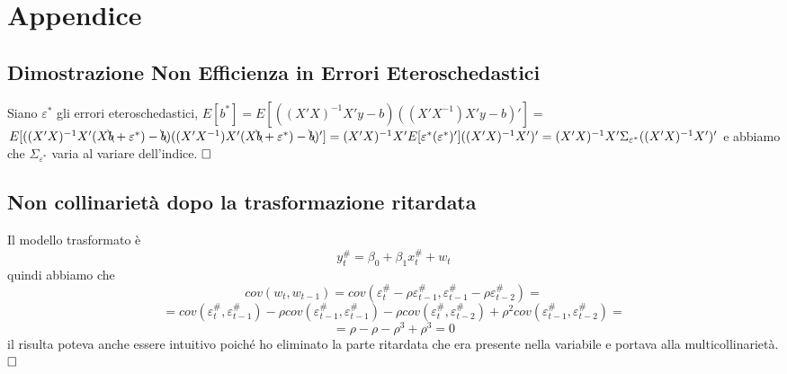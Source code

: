 \documentclass[a4page, 11pt]{article} %
\begin{document}
\section{Appendice}
\subsection{Dimostrazione Non Efficienza in Errori Eteroschedastici}
Siano $\varepsilon^*$ gli errori eteroschedastici,  $E[b^*]=E[((X'X)^{-1}X'y-b)((X'X^{-1})X'y-b)'] =$\newline  $E[((X'X)^{-1}X'(X\bcancel{b}+\varepsilon^*)-\bcancel{b})((X'X^{-1})X'(X\bcancel{b}+\varepsilon^*)-\bcancel{b})'] = (X'X)^{-1}X'E[\varepsilon^* (\varepsilon^*)']((X'X)^{-1}X')' = \newline (X'X)^{-1}X' \Sigma_{\varepsilon^*}((X'X)^{-1}X')'$ e abbiamo che $\Sigma_{\varepsilon^*}$ varia al variare dell'indice. $ \hfill \square$

\subsection{Non collinarietà dopo la trasformazione ritardata}
Il modello trasformato è 
\[y^{\#}_t = \beta_{0} + \beta_1x_t^{\#} + w_t \] 
quindi abbiamo che 
\[ cov(w_t,w_{t-1}) = cov(\varepsilon_t^{\#} - \rho \varepsilon_{t-1}^\#, \varepsilon_{t-1}^\# - \rho \varepsilon_{t-2}^\#) =  \]
\[ = cov(\varepsilon_{t}^\#,\varepsilon_{t-1}^\#) -\rho cov(\varepsilon_{t-1}^\#,\varepsilon_{t-1}^\#) - \rho cov(\varepsilon_{t}^\#,\varepsilon_{t-2}^\#) + \rho^2 cov(\varepsilon_{t-1}^\#,\varepsilon_{t-2}^\#) = \]
\[ = \rho - \rho - \rho^3 + \rho^3  = 0 \]
il risulta poteva anche essere intuitivo poiché ho eliminato la parte ritardata che era presente nella variabile e portava alla multicollinarietà. $\hfill \square$
\end{document}
